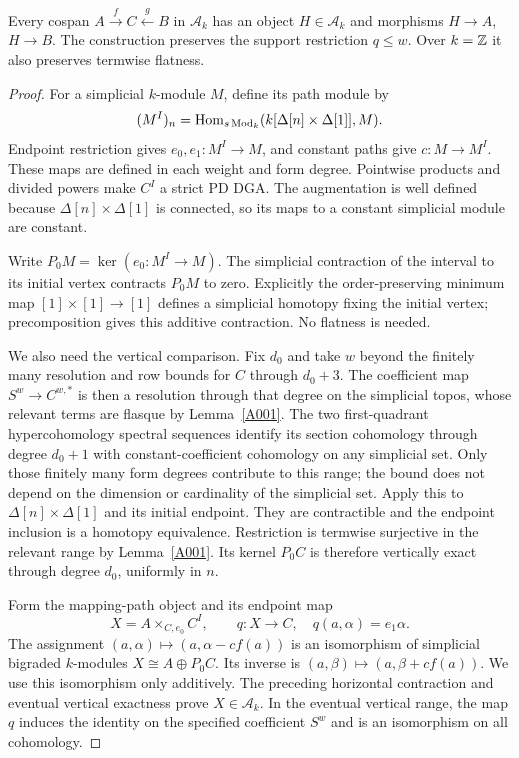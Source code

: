 \begin{proposition}
\label{A002}
Every cospan $A\xrightarrow{f}C\xleftarrow{g}B$ in $\mathcal A_k$
has an object $H\in\mathcal A_k$ and morphisms $H\to A$, $H\to B$.
The construction preserves the support restriction $q\leq w$.
Over $k=\mathbb Z$ it also preserves termwise flatness.
\end{proposition}
\begin{proof}
For a simplicial $k$-module $M$, define its path module by
\[
 (M^I)_n=\operatorname{Hom}_{s\operatorname{Mod}_k}(k[\Delta[n]\times\Delta[1]],M).
\]
Endpoint restriction gives $e_0,e_1:M^I\to M$, and constant paths give
$c:M\to M^I$. These maps are defined in each weight and form degree.
Pointwise products and divided powers make $C^I$ a strict PD DGA.
The augmentation is well defined because $\Delta[n]\times\Delta[1]$
is connected, so its maps to a constant simplicial module are constant.

Write $P_0M=\ker(e_0:M^I\to M)$. The simplicial contraction of the
interval to its initial vertex contracts $P_0M$ to zero. Explicitly the
order-preserving minimum map $[1]\times[1]\to[1]$ defines a simplicial
homotopy fixing the initial vertex; precomposition gives this additive
contraction. No flatness is needed.

We also need the vertical comparison. Fix $d_0$ and take $w$ beyond
the finitely many resolution and row bounds for $C$ through $d_0+3$.
The coefficient map $S^w\to C^{w,*}$ is then a resolution through
that degree on the simplicial topos, whose relevant terms are flasque
by Lemma~\ref{A001}. The two first-quadrant hypercohomology spectral
sequences identify its section cohomology through degree $d_0+1$
with constant-coefficient cohomology on any simplicial set. Only those
finitely many form degrees contribute to this range; the bound does
not depend on the dimension or cardinality of the simplicial set.
Apply this to $\Delta[n]\times\Delta[1]$ and its initial endpoint.
They are contractible and the endpoint inclusion is a homotopy
equivalence. Restriction is termwise surjective in the relevant range
by Lemma~\ref{A001}. Its kernel $P_0C$ is therefore vertically exact
through degree $d_0$, uniformly in $n$.

Form the mapping-path object and its endpoint map
\[
 X=A\mathop{\times}_{C,e_0}C^I,
 \qquad q:X\to C,\quad q(a,\alpha)=e_1\alpha.
\]
The assignment $(a,\alpha)\mapsto(a,\alpha-cf(a))$ is an isomorphism
of simplicial bigraded $k$-modules $X\cong A\oplus P_0C$.
Its inverse is $(a,\beta)\mapsto(a,\beta+cf(a))$.
We use this isomorphism only additively. The preceding horizontal
contraction and eventual vertical exactness prove $X\in\mathcal A_k$.
In the eventual vertical range, the map $q$ induces the identity on
the specified coefficient $S^w$ and is an isomorphism on all cohomology.


\end{proof}
